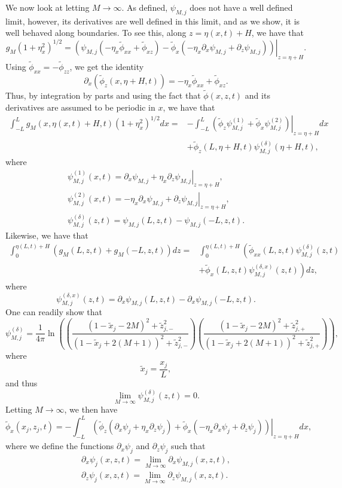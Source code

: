 \documentclass[a4paper,11pt]{article}
\newcommand{\p}{\partial}
\begin{document}
We now look at letting $M\rightarrow\infty$.  As defined, $\psi_{M,j}$ does not have a well defined limit, however, its derivatives are well defined in this limit, and as we show, it is well behaved along boundaries.  To see this, along $z = \eta(x,t) + H$, we have that 
\[
g_{M}(1+\eta_{x}^{2})^{1/2} = \left.\left(\psi_{M,j}\left(- \eta_{x}\tilde{\phi}_{xx}+\tilde{\phi}_{xz}\right)-\tilde{\phi}_{x}\left(-\eta_{x}\p_{x}\psi_{M,j}+\p_{z}\psi_{M,j}\right) \right)\right|_{z= \eta+H}.
\]
Using $\tilde{\phi}_{xx} = -\tilde{\phi}_{zz}$, we get the identity
\[
\p_{x}\left(\tilde{\phi}_{z}(x, \eta+H,t) \right) = -\eta_{x}\tilde{\phi}_{xx} + \tilde{\phi}_{xz}.
\]
Thus, by integration by parts and using the fact that $\tilde{\phi}(x,z,t)$ and its derivatives are assumed to be periodic in $x$, we have that 
\begin{align*}
\int_{-L}^{L}g_{M}(x,\eta(x,t)+H,t) (1+\eta_{x}^{2})^{1/2}dx = & -\int_{-L}^{L} \left.\left(\tilde{\phi}_{z}\psi^{(1)}_{M,j}+\tilde{\phi}_{x}\psi^{(2)}_{M,j}\right)\right|_{z=\eta+H}dx \\
& + \tilde{\phi}_{z}(L,\eta+H,t)\psi^{(\delta)}_{M,j}(\eta+H,t),
\end{align*}
where
\begin{align*}
\psi^{(1)}_{M,j}(x,t) = \left.\p_{x}\psi_{M,j}+ \eta_{x}\p_{z}\psi_{M,j}\right|_{z=\eta+H}, \\
\psi^{(2)}_{M,j}(x,t) = \left.-\eta_{x}\p_{x}\psi_{M,j} + \p_{z}\psi_{M,j}\right|_{z=\eta+H}, \\
\psi^{(\delta)}_{M,j}(z,t) = \psi_{M,j}(L,z,t)-\psi_{M,j}(-L,z,t).
\end{align*}
Likewise, we have that 
\begin{align*}
\int_{0}^{\eta(L,t)+H} \left(g_{M}(L,z,t) + g_{M}(-L,z,t)\right) dz = & \int_{0}^{\eta(L,t)+H} \left(\tilde{\phi}_{xx}(L,z,t)\psi^{(\delta)}_{M,j}(z,t) \right.  \\
&\left. + \tilde{\phi}_{x}(L,z,t)\psi^{(\delta,x)}_{M,j}(z,t) \right) dz, 
\end{align*}
where
\[
\psi^{(\delta,x)}_{M,j}(z,t) = \p_{x}\psi_{M,j}(L,z,t)-\p_{x}\psi_{M,j}(-L,z,t). 
\]
One can readily show that 
\[
\psi_{M,j}^{(\delta)} = \frac{1}{4\pi}\ln\left(\left(\frac{(1-\tilde{x}_{j}-2M)^{2}+\tilde{z}_{j,-}^{2}}{(1-\tilde{x}_{j}+2(M+1))^{2}+\tilde{z}_{j,-}^{2}}\right) \left(\frac{(1-\tilde{x}_{j}-2M)^{2}+\tilde{z}_{j,+}^{2}}{(1-\tilde{x}_{j}+2(M+1))^{2}+\tilde{z}_{j,+}^{2}}\right) \right),
\]
where
\[
\tilde{x}_{j} = \frac{x_{j}}{L},
\]
and thus 
\[
\lim_{M\rightarrow\infty}\psi_{M,j}^{(\delta)}(z,t) = 0.
\]
Letting $M\rightarrow \infty$, we then have 
\[
\tilde{\phi}_{x}(x_{j},z_{j},t) = -\int_{-L}^{L} \left.\left(\tilde{\phi}_{z}\left(\p_{x}\psi_{j}+ \eta_{x}\p_{z}\psi_{j}\right)+\tilde{\phi}_{x}\left(-\eta_{x}\p_{x}\psi_{j} + \p_{z}\psi_{j} \right) \right)\right|_{z=\eta+H}dx,
\]
where we define the functions $\p_{x}\psi_{j}$ and $\p_{z}\psi_{j}$ such that 
\begin{align*}
\p_{x}\psi_{j}(x,z,t) = \lim_{M\rightarrow\infty}\p_{x}\psi_{M,j}(x,z,t), \\
\p_{z}\psi_{j}(x,z,t) = \lim_{M\rightarrow\infty}\p_{z}\psi_{M,j}(x,z,t).
\end{align*}
\end{document}
